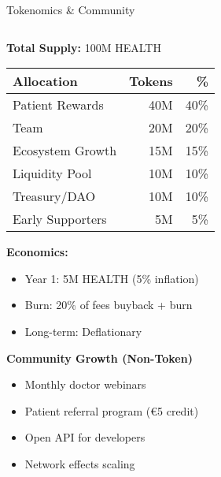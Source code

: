 \documentclass[aspectratio=169,xcolor=dvipsnames,20pt]{beamer}
\newcommand{\checkitem}{\item[\color{SuccessGreen}\faCheckCircle]}
\begin{document}
\begin{frame}{Tokenomics \& Community}
\begin{columns}[T]
\begin{column}{0.5\textwidth}
      \textbf{Total Supply:} 100M HEALTH

      \begin{table}
        \scriptsize
        \begin{tabular}{lrr}
          \toprule
          \textbf{Allocation} & \textbf{Tokens} & \textbf{\%} \\
          \midrule
          Patient Rewards & 40M & 40\% \\
          Team & 20M & 20\% \\
          Ecosystem Growth & 15M & 15\% \\
          Liquidity Pool & 10M & 10\% \\
          Treasury/DAO & 10M & 10\% \\
          Early Supporters & 5M & 5\% \\
          \bottomrule
        \end{tabular}
      \end{table}

      \vspace{0.3cm}

      \textbf{Economics:}
      \begin{itemize}
        \checkitem Year 1: 5M HEALTH (5\% inflation)
        \checkitem Burn: 20\% of fees buyback + burn
        \checkitem Long-term: Deflationary
      \end{itemize}

      \vspace{0.3cm}

      \textbf{\textcolor{FadjmaBlue}{Community Growth (Non-Token)}}
      \begin{itemize}
        \checkitem Monthly doctor webinars
        \checkitem Patient referral program (€5 credit)
        \checkitem Open API for developers
        \checkitem Network effects scaling
      \end{itemize}
    \end{column}
  \end{columns}

\end{frame}
\end{document}
